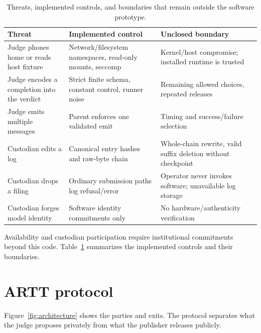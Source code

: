 \documentclass[10pt,twocolumn]{article}
\begin{document}
\begin{table}[t]
\centering\small
\begin{tabular}{@{}>{\raggedright\arraybackslash}p{}>{\raggedright\arraybackslash}p{}>{\raggedright\arraybackslash}p{}@{}}\toprule
Threat & Implemented control & Unclosed boundary\\
\midrule
Judge phones home or reads host fixture & Network/filesystem namespaces, read-only mounts, seccomp & Kernel/host compromise; installed runtime is trusted\\
Judge encodes a completion into the verdict & Strict finite schema, constant control, runner noise & Remaining allowed choices, repeated releases\\
Judge emits multiple messages & Parent enforces one validated emit & Timing and success/failure selection\\
Custodian edits a log & Canonical entry hashes and raw-byte chain & Whole-chain rewrite, valid suffix deletion without checkpoint\\
Custodian drops a filing & Ordinary submission paths log refusal/error & Operator never invokes software; unavailable log storage\\
Custodian forges model identity & Software identity commitments only & No hardware/authenticity verification\\
\bottomrule\end{tabular}
\caption{Threats, implemented controls, and boundaries that remain outside the software prototype.}
\label{tab:threats}
\end{table}

Availability and custodian participation require institutional commitments beyond this code. Table~\ref{tab:threats} summarizes the implemented controls and their boundaries.


\section{ARTT protocol}\label{sec:protocol}

Figure~\ref{fig:architecture} shows the parties and exits. The protocol separates what the judge proposes privately from what the publisher releases publicly.
\end{document}
